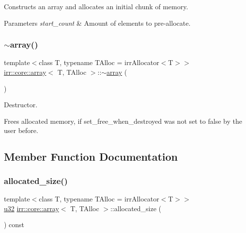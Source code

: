 Constructs an array and allocates an initial chunk of memory. 


\begin{DoxyParams}{Parameters}
{\em start\+\_\+count} & Amount of elements to pre-\/allocate. \\
\hline
\end{DoxyParams}
\mbox{\label{classirr_1_1core_1_1array_aac1853f45d4c18feaacac9859efe9836}} 
\subsubsection{\texorpdfstring{$\sim$array()}{~array()}}
{\footnotesize\ttfamily template$<$class T, typename T\+Alloc = irr\+Allocator$<$\+T$>$$>$ \\
\hyperlink{classirr_1_1core_1_1array}{irr\+::core\+::array}$<$ T, T\+Alloc $>$\+::$\sim$\hyperlink{classirr_1_1core_1_1array}{array} (\begin{DoxyParamCaption}{ }\end{DoxyParamCaption})\hspace{0.3cm}{\ttfamily [inline]}}



Destructor. 

Frees allocated memory, if set\+\_\+free\+\_\+when\+\_\+destroyed was not set to false by the user before. 

\subsection{Member Function Documentation}
\mbox{\label{classirr_1_1core_1_1array_a21e5b20b7a56ba174b19b6c36c78a14b}} 
\subsubsection{\texorpdfstring{allocated\+\_\+size()}{allocated\_size()}}
{\footnotesize\ttfamily template$<$class T, typename T\+Alloc = irr\+Allocator$<$\+T$>$$>$ \\
\hyperlink{namespaceirr_a0416a53257075833e7002efd0a18e804}{u32} \hyperlink{classirr_1_1core_1_1array}{irr\+::core\+::array}$<$ T, T\+Alloc $>$\+::allocated\+\_\+size (\begin{DoxyParamCaption}{ }\end{DoxyParamCaption}) const\hspace{0.3cm}{\ttfamily [inline]}}



